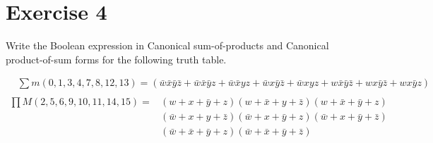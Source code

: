\documentclass{article}
\begin{document}
    \section{Exercise 4}
    \begin{flushleft}
        Write the Boolean expression in Canonical sum-of-products and Canonical
        product-of-sum forms for the following truth table.
    \end{flushleft}
    \begin{align*}
        &\sum m(0, 1, 3, 4, 7, 8, 12, 13) = \left(\bar{w}\bar{x}\bar{y}\bar{z} + \bar{w}\bar{x}\bar{y}z +
        \bar{w}\bar{x}yz + \bar{w}x\bar{y}\bar{z} + \bar{w}xyz + w\bar{x}\bar{y}\bar{z} + wx\bar{y}\bar{z} + wx\bar{y}z\right) \\
    \end{align*}
    \begin{align*}
        \prod M(2, 5, 6, 9, 10, 11, 14, 15) = &(w+x+\bar{y}+z) (w+\bar{x}+y+\bar{z})(w+\bar{x}+\bar{y}+z) \\
        &(\bar{w}+x+y+\bar{z})(\bar{w}+x+\bar{y}+z)(\bar{w}+x+\bar{y}+\bar{z}) \\
        &(\bar{w}+\bar{x}+\bar{y}+z)(\bar{w}+\bar{x}+\bar{y}+\bar{z})
    \end{align*}
    \newpage
\end{document}
